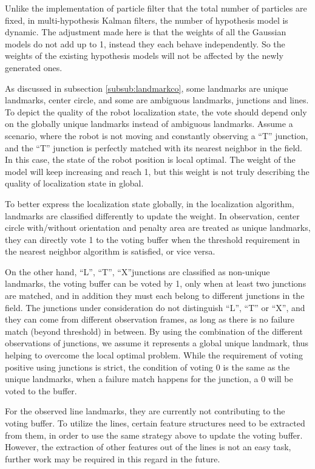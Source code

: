 Unlike the implementation of particle filter that the total number of particles are fixed, in multi-hypothesis Kalman filters, the number of hypothesis model is dynamic. The adjustment made here is that the weights of all the Gaussian models do not add up to 1, instead they each behave independently. So the weights of the existing hypothesis models will not be affected by the newly generated ones.

As discussed in subsection \ref{subsub:landmarkco}, some landmarks are unique landmarks, \ie{} center circle, and some are ambiguous landmarks, \ie{} junctions and lines. To depict the quality of the robot localization state, the vote should depend only on the globally unique landmarks instead of ambiguous landmarks. Assume a scenario, where the robot is not moving and constantly observing a ``T'' junction, and the ``T'' junction is perfectly matched with its nearest neighbor in the field. In this case, the state of the robot position is local optimal. The weight of the model will keep increasing and reach 1, but this weight is not truly describing the quality of localization state in global. 

To better express the localization state globally, in the localization algorithm, landmarks are classified differently to update the weight. In observation, center circle with/without orientation and penalty area are treated as unique landmarks, they can directly vote 1 to the voting buffer when the threshold requirement in the nearest neighbor algorithm is satisfied, or vice versa. 

On the other hand, ``L'', ``T'', ``X''junctions are classified as non-unique landmarks, the voting buffer can be voted by 1, only when at least two junctions are matched, and in addition they must each belong to different junctions in the field. The junctions under consideration do not distinguish ``L'', ``T'' or ``X'', and they can come from different observation frames, as long as there is no failure match (beyond threshold) in between. By using the combination of the different observations of junctions, we assume it represents a global unique landmark, thus helping to overcome the local optimal problem. While the requirement of voting positive using junctions is strict, the condition of voting 0 is the same as the unique landmarks, \ie{} when a failure match happens for the junction, a 0 will be voted to the buffer.  

For the observed line landmarks, they are currently not contributing to the voting buffer. To utilize the lines, certain feature structures need to be extracted from them, in order to use the same strategy above to update the voting buffer. However, the extraction of other features out of the lines is not an easy task, further work may be required in this regard in the future. 



